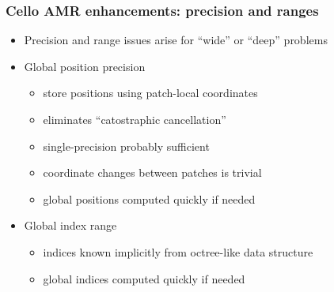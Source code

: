 \begin{frame}[fragile] 
\frametitle{Cello AMR enhancements: precision and ranges}
\begin{itemize}
\item Precision and range issues arise for ``wide'' or ``deep'' problems
\item    Global position precision
\begin{itemize}
\item store positions using patch-local coordinates
\item eliminates ``catostraphic cancellation''
\item single-precision probably sufficient
\item coordinate changes between patches is trivial
\item global positions computed quickly if needed
\end{itemize}
\item Global index range
\begin{itemize}
\item indices known implicitly from octree-like data structure
\item global indices computed quickly if needed
\end{itemize}
\end{itemize}
\end{frame}


